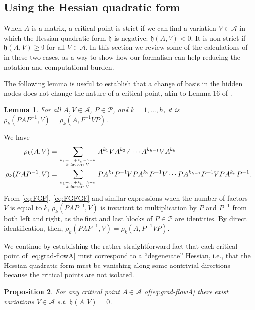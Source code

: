 \documentclass{article}
\makeatletter
\renewenvironment{proof}[1][\proofname]{
  \par\pushQED{\qed}\normalfont
  \topsep6\p@\@plus6\p@\relax
  \trivlist\item[\hskip\labelsep\bfseries#1\@addpunct{.}]
  \ignorespaces
}{
  \popQED\endtrivlist\@endpefalse
}
\newtheorem{proposition}{Proposition}
\newtheorem{lemma}[proposition]{Lemma}
\newcommand{\1}{\mathds{1}}
\makeatother
\begin{document}
\subsection{Using the Hessian quadratic form}
When $A$ is a matrix, a critical point is strict if we can find a variation $ V \in \mathcal{A} $ in 
which the Hessian quadratic form $\mathfrak{h}$ is negative: $ \mathfrak{h}(A,V)<0$. 
It is non-strict if $ \mathfrak{h}(A,V)\geq 0 $ for all $ V \in \mathcal{A}$.
In this section we review some of the calculations of \cite{achour2021loss} in these two cases, as a way to show how our formalism can help reducing the notation and computational burden.

The following lemma is useful to establish that a change of basis in the hidden nodes does not change the nature of a critical point, akin to Lemma 16 of \cite{achour2021loss}. 
\begin{lemma} \label{lem:equivariant_rho}
    For all $A, V\in \mathcal{ A} $, $P \in \mathcal{P}$, and $k=1,...,h$, it is $ \rho_k(PAP^{-1},V) = \rho_k(A,P^{-1} V P)$.
\end{lemma}
\begin{proof}
    We have
\begin{align}
	\rho_k(A,V) & = \sum_{k_1+...+k_h = h-k \atop k \text{ factors } V} A^{k_1} V A^{k_2} V \cdots A^{k_{h-1}} V A^{k_h} \label{eq:rho_k_A} \\
	\rho_k(PAP^{-1},V) & = \sum_{k_1+...+k_h = h-k \atop k \text{ factors } V} P A^{k_1} P^{-1} V P A^{k_2} P^{-1} V \cdots P A^{k_{h-1}} P^{-1} V P A^{k_h} P^{-1} .\label{eq:rho_k_PAP}
\end{align}
From \eqref{eq:FGF}, \eqref{eq:FGFGF} and similar expressions when the number of factors $V$ is equal to $k$,  $\rho_k(PAP^{-1},V)$ is invariant to multiplication by $P$ and $P^{-1}$ from both left and right, as the first and last blocks of $P\in \mathcal{ P}$ are identities. By direct identification, then, $\rho_k(PAP^{-1},V) = \rho_k(A,P^{-1}VP)$.
\end{proof}

We continue by establishing the rather straightforward fact that each critical point of \eqref{eq:grad-flowA} must correspond to a ``degenerate'' Hessian, i.e., that the Hessian quadratic form must be vanishing along some nontrivial directions because the critical points are not isolated. 

\begin{proposition}
For any critical point $ A \in \mathcal{A} $ of\eqref{eq:grad-flowA} there exist variations $ V \in \mathcal{A}$ s.t. $ \mathfrak{h}(A,V)=0$. 
\end{proposition}
\end{document}
